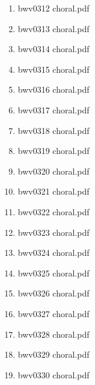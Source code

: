 \documentclass[11pt]{article}
\begin{document}
\begin{enumerate}
\begin{enumerate}
\begin{enumerate}
\begin{enumerate}
\item bwv0312 choral.pdf
\label{sec-1-1-1-1-44-6-7-2-4-61}

\item bwv0313 choral.pdf
\label{sec-1-1-1-1-44-6-7-2-4-62}

\item bwv0314 choral.pdf
\label{sec-1-1-1-1-44-6-7-2-4-63}

\item bwv0315 choral.pdf
\label{sec-1-1-1-1-44-6-7-2-4-64}

\item bwv0316 choral.pdf
\label{sec-1-1-1-1-44-6-7-2-4-65}

\item bwv0317 choral.pdf
\label{sec-1-1-1-1-44-6-7-2-4-66}

\item bwv0318 choral.pdf
\label{sec-1-1-1-1-44-6-7-2-4-67}

\item bwv0319 choral.pdf
\label{sec-1-1-1-1-44-6-7-2-4-68}

\item bwv0320 choral.pdf
\label{sec-1-1-1-1-44-6-7-2-4-69}

\item bwv0321 choral.pdf
\label{sec-1-1-1-1-44-6-7-2-4-70}

\item bwv0322 choral.pdf
\label{sec-1-1-1-1-44-6-7-2-4-71}

\item bwv0323 choral.pdf
\label{sec-1-1-1-1-44-6-7-2-4-72}

\item bwv0324 choral.pdf
\label{sec-1-1-1-1-44-6-7-2-4-73}

\item bwv0325 choral.pdf
\label{sec-1-1-1-1-44-6-7-2-4-74}

\item bwv0326 choral.pdf
\label{sec-1-1-1-1-44-6-7-2-4-75}

\item bwv0327 choral.pdf
\label{sec-1-1-1-1-44-6-7-2-4-76}

\item bwv0328 choral.pdf
\label{sec-1-1-1-1-44-6-7-2-4-77}

\item bwv0329 choral.pdf
\label{sec-1-1-1-1-44-6-7-2-4-78}

\item bwv0330 choral.pdf
\label{sec-1-1-1-1-44-6-7-2-4-79}


\end{enumerate}
\end{enumerate}
\end{enumerate}
\end{enumerate}
\end{document}
